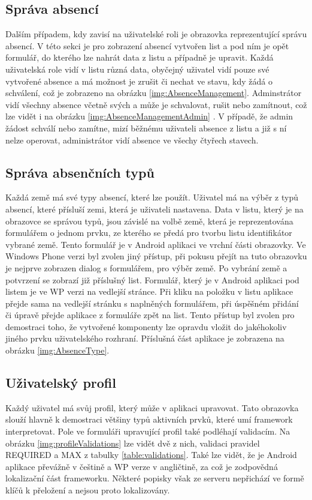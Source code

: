 \subsection{Správa absencí}
Dalším případem, kdy zavisí na uživatelské roli je obrazovka reprezentující správu absencí. V této sekci je pro zobrazení absencí vytvořen list a pod ním je opět formulář, do kterého lze nahrát data z listu a případně je upravit. Každá uživatelská role vidí v listu různá data, obyčejný uživatel vidí pouze své vytvořené absence a má možnost je zrušit či nechat ve stavu, kdy žádá o schválení, což je zobrazeno na obrázku \ref{img:AbsenceManagement}. Adminstrátor vidí všechny absence včetně svých a může je schvalovat, rušit nebo zamítnout, což lze vidět i na obrázku \ref{img:AbsenceManagementAdmin} . V případě, že admin žádost schválí nebo zamítne, mizí běžnému uživateli absence z listu a již s ní nelze operovat, administrátor vidí absence ve všechy čtyřech stavech. 
\subsection{Správa absenčních typů}
Každá země má své typy absencí, které lze použít. Uživatel má na výběr z typů absencí, které přísluší zemi, která je uživateli nastavena. Data v listu, který je na obrazovce se správou typů, jsou závislé na volbě země, která je reprezentována formulářem o jednom prvku, ze kterého se předá pro tvorbu listu identifikátor vybrané země. Tento formulář je v Android aplikaci ve vrchní části obrazovky. Ve Windows Phone verzi byl zvolen jiný přístup, při pokusu přejít na tuto obrazovku je nejprve zobrazen dialog s formulářem, pro výběr země. Po vybrání země a potvrzení se zobrazí již příslušný list. Formulář, který je v Android aplikaci pod listem je ve WP verzi na vedlejší stránce. Při kliku na položku v listu aplikace přejde sama na vedlejší stránku s naplněných formulářem, při úspěšném přidání či úpravě přejde aplikace z formuláře zpět na list. Tento přístup byl zvolen pro demostraci toho, že vytvořené komponenty lze opravdu vložit do jakéhokoliv jiného prvku uživatelského rozhraní. Příslušná část aplikace je zobrazena na obrázku \ref{img:AbsenceType}.
\subsection{Uživatelský profil}
Každý uživatel má svůj profil, který může v aplikaci upravovat. Tato obrazovka slouží hlavně k demostraci většiny typů aktivních prvků, které umí framework interpretovat. Pole ve formuláři upravující profil také podléhají validacím. Na obrázku \ref{img:profileValidations} lze vidět dvě z nich, validaci pravidel REQUIRED a MAX z tabulky \ref{table:validations}. Také lze vidět, že je Android aplikace převážně v češtině a WP verze v angličtině, za což je zodpovědná lokalizační část frameworku. Některé popisky však ze serveru nepřichází ve formě klíčů k přeložení a nejsou proto lokalizovány. 
